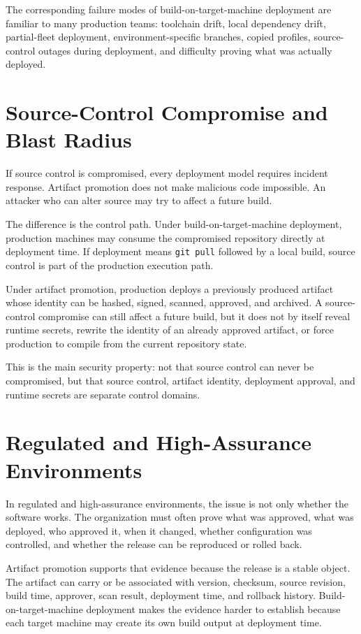 \documentclass[11pt]{article}
\begin{document}
The corresponding failure modes of build-on-target-machine deployment are familiar to many production teams: toolchain drift, local dependency drift, partial-fleet deployment, environment-specific branches, copied profiles, source-control outages during deployment, and difficulty proving what was actually deployed.

\section{Source-Control Compromise and Blast Radius}

If source control is compromised, every deployment model requires incident response. Artifact promotion does not make malicious code impossible. An attacker who can alter source may try to affect a future build.

The difference is the control path. Under build-on-target-machine deployment, production machines may consume the compromised repository directly at deployment time. If deployment means \texttt{git pull} followed by a local build, source control is part of the production execution path.

Under artifact promotion, production deploys a previously produced artifact whose identity can be hashed, signed, scanned, approved, and archived. A source-control compromise can still affect a future build, but it does not by itself reveal runtime secrets, rewrite the identity of an already approved artifact, or force production to compile from the current repository state.

This is the main security property: not that source control can never be compromised, but that source control, artifact identity, deployment approval, and runtime secrets are separate control domains.

\section{Regulated and High-Assurance Environments}

In regulated and high-assurance environments, the issue is not only whether the software works. The organization must often prove what was approved, what was deployed, who approved it, when it changed, whether configuration was controlled, and whether the release can be reproduced or rolled back.

Artifact promotion supports that evidence because the release is a stable object. The artifact can carry or be associated with version, checksum, source revision, build time, approver, scan result, deployment time, and rollback history. Build-on-target-machine deployment makes the evidence harder to establish because each target machine may create its own build output at deployment time.
\end{document}
